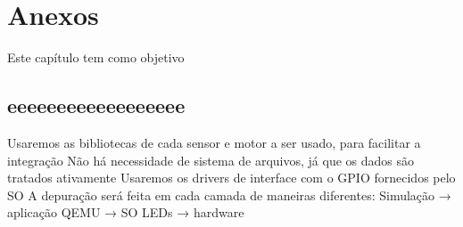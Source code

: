 \chapter{Anexos}

Este capítulo tem como objetivo 


\section{eeeeeeeeeeeeeeeeee}\label{Sub:equa}

Usaremos as bibliotecas de cada sensor e motor a ser usado, para facilitar a integração
Não há necessidade de sistema de arquivos, já que os dados são tratados ativamente
Usaremos os drivers de interface com o GPIO fornecidos pelo SO
A depuração será feita em cada camada de maneiras diferentes: 
Simulação → aplicação 
QEMU → SO 
LEDs → hardware 
